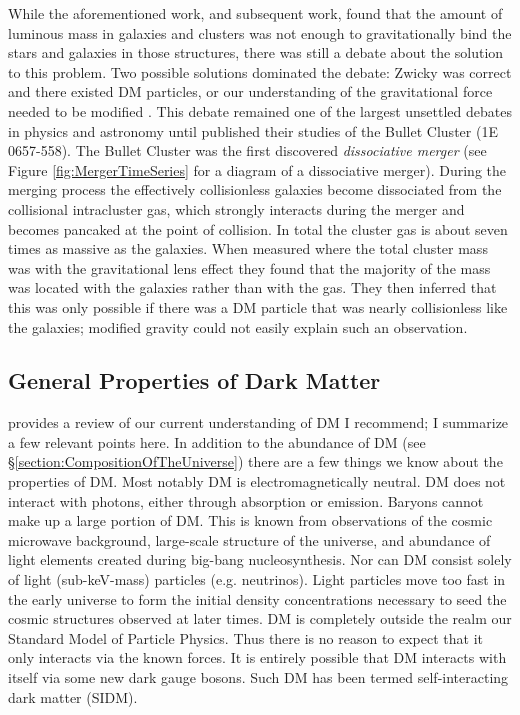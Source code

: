 While the aforementioned work, and subsequent work, found that the amount of luminous mass in galaxies and clusters was not enough to gravitationally bind the stars and galaxies in those structures, there was still a debate about the solution to this problem. 
Two possible solutions dominated the debate: Zwicky was correct and there existed DM particles, or our understanding of the gravitational force needed to be modified \citep[see][for a review]{Sanders:2002cc}.
This debate remained one of the largest unsettled debates in physics and astronomy until \citet{Clowe:2004eq} published their studies of the Bullet Cluster (1E 0657-558).
The Bullet Cluster was the first discovered \textit{dissociative merger} (see Figure \ref{fig:MergerTimeSeries} for a diagram of a dissociative merger).
During the merging process the effectively collisionless galaxies  become dissociated from the collisional intracluster gas, which strongly interacts during the merger and becomes pancaked at the point of collision.
In total the cluster gas is about seven times as massive as the galaxies.
When \citet{Clowe:2004eq} measured where the total cluster mass was with the gravitational lens effect they found that the majority of the mass was located with the galaxies rather than with the gas.
They then inferred that this was only possible if there was a DM particle that was nearly collisionless like the galaxies; modified gravity could not easily explain such an observation.

\subsection{General Properties of Dark Matter}\label{section:CDMproperties}

\citet{Peter:2012tg} provides a review of our current understanding of DM I recommend;  I summarize a few relevant points here.
In addition to the abundance of DM (see \S \ref{section:CompositionOfTheUniverse}) there are a few things we know about the properties of DM.
Most notably DM is electromagnetically neutral.
DM does not interact with photons, either through absorption or emission.
Baryons cannot make up a large portion of DM.
This is known from observations of the cosmic microwave background, large-scale structure of the universe, and abundance of light elements created during big-bang nucleosynthesis.
Nor can DM consist solely of light (sub-keV-mass) particles (e.g. neutrinos). 
Light particles move too fast in the early universe to form the initial density concentrations necessary to seed the cosmic structures observed at later times.
DM is completely outside the realm our Standard Model of Particle Physics.
Thus there is no reason to expect that it only interacts via the known forces.
It is entirely possible that DM interacts with itself via some new dark gauge bosons.
Such DM has been termed self-interacting dark matter (SIDM).

